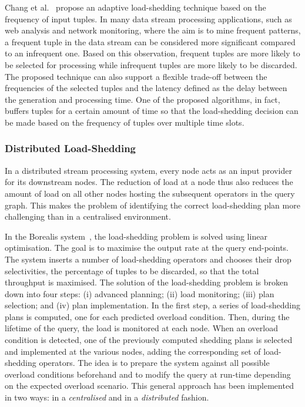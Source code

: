 Chang et al.~\cite{loadshed-chang} propose an adaptive \mbox{load-shedding} technique based on the
frequency of input tuples. 
In many data stream processing applications, such as web analysis and network monitoring,
where the aim is to mine frequent patterns, a frequent tuple in the data stream can be considered
more significant compared to an infrequent one. 
Based on this observation, frequent tuples are more likely to be selected for processing while
infrequent tuples are more likely to be discarded.
The proposed technique can also support a flexible trade-off between the frequencies of the
selected tuples and the latency defined as the delay between the generation and processing time.
One of the proposed algorithms, in fact, buffers tuples for a certain amount of time so that the
\mbox{load-shedding} decision can be made based on the frequency of tuples over multiple time slots.

\subsubsection*{Distributed \mbox{Load-Shedding}}
In a distributed stream processing system, every node acts as an input provider for its downstream nodes.
The reduction of load at a node thus also reduces the amount of load on all other nodes hosting the
subsequent operators in the query graph. This makes the problem of identifying the correct
\mbox{load-shedding} plan more challenging than in a centralised environment. 

In the Borealis system~\cite{borealis_load_management}, the \mbox{load-shedding} problem is solved using
linear optimisation.
The goal is to maximise the output rate at the query end-points. The system inserts a number of
\mbox{load-shedding} operators and chooses their drop selectivities, the percentage of tuples to be
discarded, so that the total throughput is maximised. The solution of the \mbox{load-shedding} problem is broken down into
four steps: (i) advanced planning; (ii) load monitoring; (iii) plan selection; and
(iv) plan implementation. In the first step, a series of \mbox{load-shedding} plans is computed, one for each
predicted overload condition. Then, during the lifetime of the query, the load is monitored at
each node. When an overload condition is detected, one of the previously computed shedding plans is
selected and implemented at the various nodes, adding the corresponding set of \mbox{load-shedding}
operators. The idea is to prepare the system against all possible overload conditions beforehand and to
modify the query at run-time depending on the expected overload scenario. This general approach has been
implemented in two ways: in a \emph{centralised} and in a \emph{distributed} fashion.

